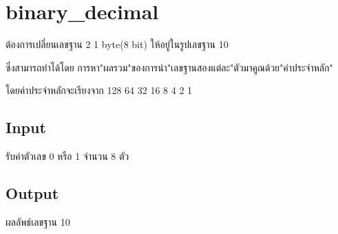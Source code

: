 \documentclass{article}
\begin{document}
\section*{binary_decimal}

ต้องการเปลี่ยนเลขฐาน 2 1 byte(8 bit) ให้อยู่ในรูปเลขฐาน 10



ซึ่งสามารถทำได้โดย การหา"ผลรวม"ของการนำ"เลขฐานสองแต่ละ"ตัวมาคูณด้วย"ค่าประจำหลัก"



โดยค่าประจำหลักจะเรียงจาก 128 64 32 16 8 4 2 1



\subsection*{Input}
รับค่าตัวเลข 0 หรือ 1 จำนวน 8 ตัว



\subsection*{Output}
ผลลัพธ์เลขฐาน 10
\end{document}
